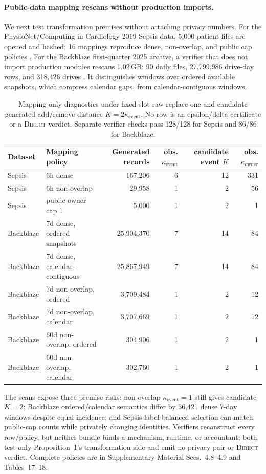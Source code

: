 \documentclass[letterpaper]{article} %
\newcommand{\Direct}{\textsc{Direct}}
\newcommand{\ke}{\kappa_{\mathrm{event}}}
\newcommand{\ko}{\kappa_{\mathrm{owner}}}
\begin{document}
\paragraph{Public-data mapping rescans without production imports.}
We next test transformation premises without attaching privacy numbers. For the PhysioNet/Computing in Cardiology 2019 Sepsis data, 5,000 patient files are opened and hashed; 16 mappings reproduce dense, non-overlap, and public cap policies \citep{reyna2020sepsis,physionet2019sepsis,pollard2026physionet,goldberger2000physionet}. For the Backblaze first-quarter 2025 archive, a verifier that does not import production modules rescans 1.02\,GB: 90 daily files, 27,799,986 drive-day rows, and 318,426 drives \citep{backblaze_drivestats}. It distinguishes windows over ordered available snapshots, which compress calendar gaps, from calendar-contiguous windows.

\begin{table}[t]
\centering
\begin{tabular}{llrrrr}
\hline
Dataset & Mapping policy & Generated records & obs. $\ke$ & candidate event $K$ & obs. $\ko$ \\
\hline
Sepsis & 6h dense & 167,206 & 6 & 12 & 331 \\
Sepsis & 6h non-overlap & 29,958 & 1 & 2 & 56 \\
Sepsis & public owner cap 1 & 5,000 & 1 & 2 & 1 \\
Backblaze & 7d dense, ordered snapshots & 25,904,370 & 7 & 14 & 84 \\
Backblaze & 7d dense, calendar-contiguous & 25,867,949 & 7 & 14 & 84 \\
Backblaze & 7d non-overlap, ordered & 3,709,484 & 1 & 2 & 12 \\
Backblaze & 7d non-overlap, calendar & 3,707,669 & 1 & 2 & 12 \\
Backblaze & 60d non-overlap, ordered & 304,906 & 1 & 2 & 1 \\
Backblaze & 60d non-overlap, calendar & 302,760 & 1 & 2 & 1 \\
\hline
\end{tabular}
\caption{Mapping-only diagnostics under fixed-slot raw replace-one and candidate generated add/remove distance $K=2\ke$. No row is an epsilon/delta certificate or a \Direct{} verdict. Separate verifier checks pass 128/128 for Sepsis and 86/86 for Backblaze.}
\label{tab:mapping}
\end{table}

The scans expose three premise risks: non-overlap $\ke=1$ still gives candidate $K=2$; Backblaze ordered/calendar semantics differ by 36,421 dense 7-day windows despite equal incidence; and Sepsis label-balanced selection can match public-cap counts while privately changing identities. Verifiers reconstruct every row/policy, but neither bundle binds a mechanism, runtime, or accountant; both test only Proposition~1's transformation side and emit no privacy pair or \Direct{} verdict. Complete policies are in Supplementary Material Secs.~4.8--4.9 and Tables~17--18.
\end{document}
